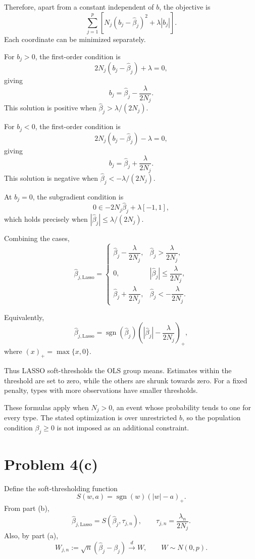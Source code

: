 \documentclass[11pt]{article}
\begin{document}
Therefore, apart from a constant independent
of $b$, the objective is
\[
\sum_{j=1}^p
\left[
N_j(b_j-\widehat{\beta}_j)^2+\lambda|b_j|
\right].
\]
Each coordinate can be minimized separately.

For $b_j>0$, the first-order condition is
\[
2N_j(b_j-\widehat{\beta}_j)+\lambda=0,
\]
giving
\[
b_j=\widehat{\beta}_j-\frac{\lambda}{2N_j}.
\]
This solution is positive when
$\widehat{\beta}_j>\lambda/(2N_j)$.

For $b_j<0$, the first-order condition is
\[
2N_j(b_j-\widehat{\beta}_j)-\lambda=0,
\]
giving
\[
b_j=\widehat{\beta}_j+\frac{\lambda}{2N_j}.
\]
This solution is negative when
$\widehat{\beta}_j<-\lambda/(2N_j)$.

At $b_j=0$, the subgradient condition is
\[
0\in-2N_j\widehat{\beta}_j+\lambda[-1,1],
\]
which holds precisely when
$|\widehat{\beta}_j|\leq\lambda/(2N_j)$.

Combining the cases,
\[
\boxed{
\widehat{\beta}_{j,\mathrm{Lasso}}
=
\begin{cases}
\widehat{\beta}_j-\dfrac{\lambda}{2N_j},
&
\widehat{\beta}_j>\dfrac{\lambda}{2N_j},
\\[6pt]
0,
&
|\widehat{\beta}_j|\leq\dfrac{\lambda}{2N_j},
\\[6pt]
\widehat{\beta}_j+\dfrac{\lambda}{2N_j},
&
\widehat{\beta}_j<-\dfrac{\lambda}{2N_j}.
\end{cases}
}
\]

Equivalently,
\[
\widehat{\beta}_{j,\mathrm{Lasso}}
=
\operatorname{sgn}(\widehat{\beta}_j)
\left(
|\widehat{\beta}_j|-\frac{\lambda}{2N_j}
\right)_+,
\]
where $(x)_+=\max\{x,0\}$.

Thus LASSO soft-thresholds the OLS group means.
Estimates within the threshold are set to zero,
while the others are shrunk towards zero.
For a fixed penalty, types with more observations
have smaller thresholds.

These formulas apply when $N_j>0$, an event
whose probability tends to one for every type.
The stated optimization is over unrestricted
$b$, so the population condition $\beta_j\geq0$
is not imposed as an additional constraint.
\section*{Problem 4(c)}

Define the soft-thresholding function
\[
S(w,a)=\operatorname{sgn}(w)(|w|-a)_+.
\]
From part (b),
\[
\widehat{\beta}_{j,\mathrm{Lasso}}
=S(\widehat{\beta}_j,\tau_{j,n}),
\qquad
\tau_{j,n}=\frac{\lambda_n}{2N_j}.
\]
Also, by part (a),
\[
W_{j,n}:=\sqrt{n}(\widehat{\beta}_j-\beta_j)
\xrightarrow{d}W,
\qquad W\sim N(0,p).
\]
\end{document}
